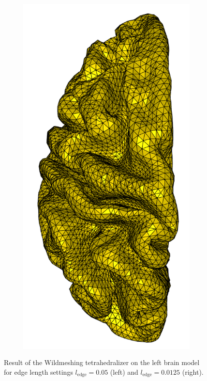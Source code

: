 \documentclass[acmtog]{acmart}
\begin{document}
\begin{figure}[H]
\begin{subfigure}{0.22\textwidth}
  \end{subfigure}
  \begin{subfigure}{0.22\textwidth}
    \includegraphics[width=\textwidth]{Images/left_brain_fine.png}
    \centering
  \end{subfigure}\hfill
  \caption{Result of the Wildmeshing tetrahedralizer on the left brain model for edge length settings $l_\mathrm{edge}  = 0.05$ (left) and $l_\mathrm{edge}  = 0.0125$ (right).}
\end{figure}
\end{document}
